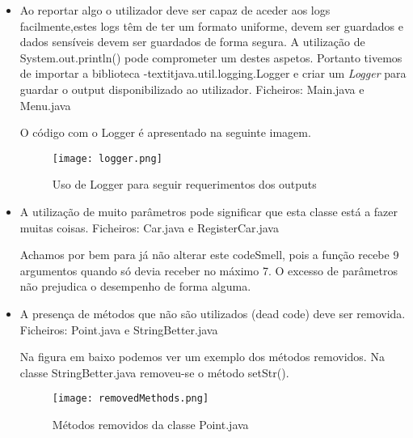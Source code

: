\begin{itemize}
\item Ao reportar algo o utilizador deve ser capaz de aceder aos logs facilmente,estes logs têm de ter um formato uniforme, devem ser guardados e dados sensíveis devem ser guardados de forma segura. A utilização de System.out.println() pode comprometer um destes aspetos. Portanto tivemos de importar a biblioteca -textit{java.util.logging.Logger} e criar um \textit{Logger} para guardar o output disponibilizado ao utilizador.\newline
 Ficheiros: Main.java e  Menu.java\newline

\par O código com o Logger é apresentado na seguinte imagem.

 \begin{figure}[H]

  \centering

  \texttt{[image: logger.png]}

  \caption {Uso de Logger para seguir requerimentos dos outputs}

  \label {fig14}

\end{figure}
\end{itemize}

\begin{itemize}
\item A utilização de muito parâmetros pode significar que esta classe está a fazer muitas coisas. \newline
Ficheiros: Car.java e RegisterCar.java\newline


\par Achamos por bem para já não alterar este codeSmell, pois a função recebe 9 argumentos quando só devia receber no máximo 7. O excesso de parâmetros não prejudica o desempenho de forma alguma.

\end{itemize}

\begin{itemize}
\item A presença de métodos que não são utilizados (dead code) deve ser removida. \newline
Ficheiros: Point.java e StringBetter.java \newline

\par Na figura em baixo podemos ver um exemplo dos métodos removidos. Na classe StringBetter.java removeu-se o método setStr().
 \begin{figure}[H]

  \centering

  \texttt{[image: removedMethods.png]}

  \caption {Métodos removidos da classe Point.java}

  \label {fig15}

\end{figure}
\end{itemize}

